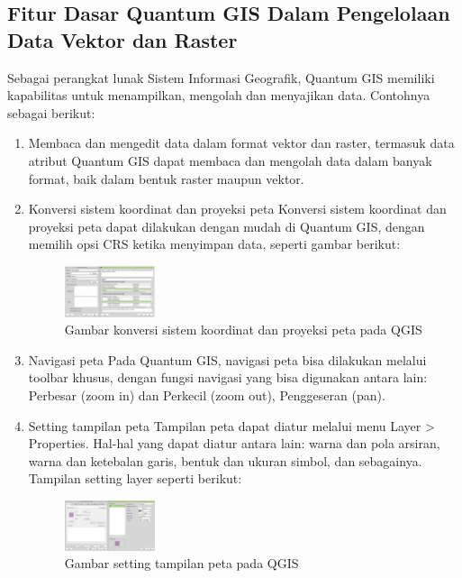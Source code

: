 \subsection{Fitur Dasar Quantum GIS Dalam Pengelolaan Data Vektor dan Raster}
Sebagai perangkat lunak Sistem Informasi Geografik, Quantum GIS memiliki kapabilitas untuk menampilkan, mengolah dan menyajikan data. Contohnya sebagai berikut:
\begin{enumerate}
\item
Membaca dan mengedit data dalam format vektor dan raster, termasuk data atribut
Quantum GIS dapat membaca dan mengolah data dalam banyak format, baik dalam bentuk raster maupun vektor.
\item
Konversi sistem koordinat dan proyeksi peta
Konversi sistem koordinat dan proyeksi peta dapat dilakukan dengan mudah di Quantum GIS, dengan memilih opsi CRS ketika menyimpan data, seperti gambar berikut:
\begin{figure}[ht]
    \centerline{\includegraphics[width=0.25\textwidth]{figures/proyeksi}}
    \caption{Gambar konversi sistem koordinat dan proyeksi peta pada QGIS}
    \label{qgis:proyeksi}
    \end{figure}
\item
Navigasi peta
Pada Quantum GIS, navigasi peta bisa dilakukan melalui toolbar khusus, dengan fungsi navigasi yang bisa digunakan antara lain: Perbesar (zoom in) dan Perkecil (zoom out), Penggeseran (pan).
\item
Setting tampilan peta
Tampilan peta dapat diatur melalui menu Layer > Properties. Hal-hal yang dapat diatur antara lain: warna dan pola arsiran, warna dan ketebalan garis, bentuk dan ukuran simbol, dan sebagainya. Tampilan setting layer seperti berikut:
\begin{figure}[ht]
    \centerline{\includegraphics[width=0.25\textwidth]{figures/setting}}
    \caption{Gambar setting tampilan peta pada QGIS}
    \label{qgis:setting}
    \end{figure}
\end{enumerate}

